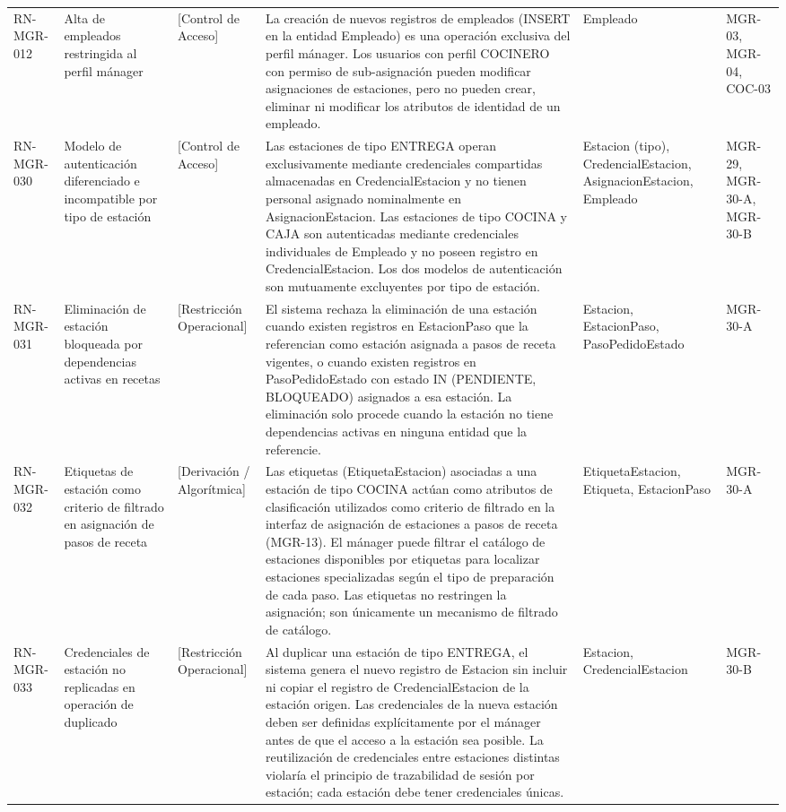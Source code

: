 \begin{landscape}
\begin{longtable}[c]{l p{2.1cm} p{2.1cm} p{8cm} p{4cm} p{3cm}}
\addlinespace
RN-MGR-012 & Alta de empleados restringida al perfil mánager & [Control de Acceso] & La creación de nuevos registros de empleados (INSERT en la entidad Empleado) es una operación exclusiva del perfil mánager. Los usuarios con perfil COCINERO con permiso de sub-asignación pueden modificar asignaciones de estaciones, pero no pueden crear, eliminar ni modificar los atributos de identidad de un empleado. & Empleado & MGR-03, MGR-04, COC-03 \\
\addlinespace
RN-MGR-030 & Modelo de autenticación diferenciado e incompatible por tipo de estación & [Control de Acceso] & Las estaciones de tipo ENTREGA operan exclusivamente mediante credenciales compartidas almacenadas en CredencialEstacion y no tienen personal asignado nominalmente en AsignacionEstacion. Las estaciones de tipo COCINA y CAJA son autenticadas mediante credenciales individuales de Empleado y no poseen registro en CredencialEstacion. Los dos modelos de autenticación son mutuamente excluyentes por tipo de estación. & Estacion (tipo), CredencialEstacion, AsignacionEstacion, Empleado & MGR-29, MGR-30-A, MGR-30-B \\
\addlinespace
RN-MGR-031 & Eliminación de estación bloqueada por dependencias activas en recetas & [Restricción Operacional] & El sistema rechaza la eliminación de una estación cuando existen registros en EstacionPaso que la referencian como estación asignada a pasos de receta vigentes, o cuando existen registros en PasoPedidoEstado con estado IN (PENDIENTE, BLOQUEADO) asignados a esa estación. La eliminación solo procede cuando la estación no tiene dependencias activas en ninguna entidad que la referencie. & Estacion, EstacionPaso, PasoPedidoEstado & MGR-30-A \\
\addlinespace
RN-MGR-032 & Etiquetas de estación como criterio de filtrado en asignación de pasos de receta & [Derivación / Algorítmica] & Las etiquetas (EtiquetaEstacion) asociadas a una estación de tipo COCINA actúan como atributos de clasificación utilizados como criterio de filtrado en la interfaz de asignación de estaciones a pasos de receta (MGR-13). El mánager puede filtrar el catálogo de estaciones disponibles por etiquetas para localizar estaciones specializadas según el tipo de preparación de cada paso. Las etiquetas no restringen la asignación; son únicamente un mecanismo de filtrado de catálogo. & EtiquetaEstacion, Etiqueta, EstacionPaso & MGR-30-A \\
\addlinespace
RN-MGR-033 & Credenciales de estación no replicadas en operación de duplicado & [Restricción Operacional] & Al duplicar una estación de tipo ENTREGA, el sistema genera el nuevo registro de Estacion sin incluir ni copiar el registro de CredencialEstacion de la estación origen. Las credenciales de la nueva estación deben ser definidas explícitamente por el mánager antes de que el acceso a la estación sea posible. La reutilización de credenciales entre estaciones distintas violaría el principio de trazabilidad de sesión por estación; cada estación debe tener credenciales únicas. & Estacion, CredencialEstacion & MGR-30-B \\

\end{longtable}
\end{landscape}
